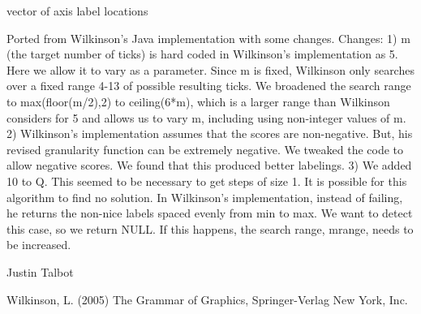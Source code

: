 \documentclass[letterpaper]{book}
\begin{document}
%
\begin{Value}
vector of axis label locations
\end{Value}
%
\begin{Note}\relax
Ported from Wilkinson's Java implementation with some
changes.  Changes: 1) m (the target number of ticks) is
hard coded in Wilkinson's implementation as 5.  Here we
allow it to vary as a parameter. Since m is fixed,
Wilkinson only searches over a fixed range 4-13 of
possible resulting ticks.  We broadened the search range
to max(floor(m/2),2) to ceiling(6*m), which is a larger
range than Wilkinson considers for 5 and allows us to
vary m, including using non-integer values of m.  2)
Wilkinson's implementation assumes that the scores are
non-negative. But, his revised granularity function can
be extremely negative. We tweaked the code to allow
negative scores.  We found that this produced better
labelings.  3) We added 10 to Q. This seemed to be
necessary to get steps of size 1.  It is possible for
this algorithm to find no solution.  In Wilkinson's
implementation, instead of failing, he returns the
non-nice labels spaced evenly from min to max.  We want
to detect this case, so we return NULL. If this happens,
the search range, mrange, needs to be increased.
\end{Note}
%
\begin{Author}\relax
Justin Talbot 
\end{Author}
%
\begin{References}\relax
Wilkinson, L. (2005) The Grammar of Graphics,
Springer-Verlag New York, Inc.
\end{References}
\printindex{}
\end{document}
